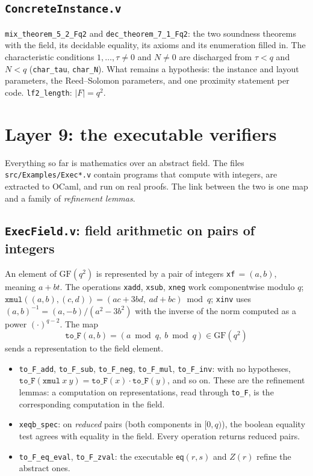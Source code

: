 \documentclass[11pt,a4paper]{article}
\newcommand{\eq}{\mathsf{eq}}
\theoremstyle{definition}
\theoremstyle{plain}
\begin{document}
\subsection{\texttt{ConcreteInstance.v}}

\texttt{mix\_theorem\_5\_2\_Fq2} and \texttt{dec\_theorem\_7\_1\_Fq2}: the two soundness theorems with the
field, its decidable equality, its axioms and its enumeration filled in. The characteristic
conditions $1,\dots,\tau\ne0$ and $N\ne0$ are discharged from $\tau<q$ and $N<q$
(\texttt{char\_tau}, \texttt{char\_N}). What remains a hypothesis: the instance and layout parameters,
the Reed--Solomon parameters, and one proximity statement per code. \texttt{lf2\_length}: $|F|=q^2$.

\section{Layer 9: the executable verifiers}
\label{sec:fm-exec}

Everything so far is mathematics over an abstract field. The files \texttt{src/Examples/Exec*.v}
contain programs that compute with integers, are extracted to OCaml, and run on real proofs. The
link between the two is one map and a family of \emph{refinement lemmas}.

\subsection{\texttt{ExecField.v}: field arithmetic on pairs of integers}

An element of $\mathrm{GF}(q^2)$ is represented by a pair of integers \texttt{xf}$\,=(a,b)$, meaning
$a+bt$. The operations \texttt{xadd}, \texttt{xsub}, \texttt{xneg} work componentwise modulo $q$;
$\mathtt{xmul}((a,b),(c,d))=(ac+3bd,\ ad+bc)\bmod q$; \texttt{xinv} uses $(a,b)^{-1}=(a,-b)/(a^2-3b^2)$
with the inverse of the norm computed as a power $(\cdot)^{q-2}$. The map
\[
  \mathtt{to\_F}(a,b)=(a\bmod q,\ b\bmod q)\in\mathrm{GF}(q^2)
\]
sends a representation to the field element.
\begin{itemize}[leftmargin=1.3em]
\item \texttt{to\_F\_add}, \texttt{to\_F\_sub}, \texttt{to\_F\_neg}, \texttt{to\_F\_mul}, \texttt{to\_F\_inv}: with no
  hypotheses, $\mathtt{to\_F}(\mathtt{xmul}\ x\ y)=\mathtt{to\_F}(x)\cdot\mathtt{to\_F}(y)$, and so on. These are
  the refinement lemmas: a computation on representations, read through \texttt{to\_F}, is the
  corresponding computation in the field.
\item \texttt{xeqb\_spec}: on \emph{reduced} pairs (both components in $[0,q)$), the boolean equality
  test agrees with equality in the field. Every operation returns reduced pairs.
\item \texttt{to\_F\_eq\_eval}, \texttt{to\_F\_zval}: the executable $\eq(r,s)$ and $Z(r)$ refine the
  abstract ones.
\end{itemize}
\end{document}
